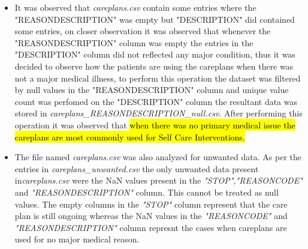 \documentclass[12pt, twosided]{report}  %
\begin{document}
\begin{itemize}
	\item It was observed that \textit{careplans.csv} contain some entries where the "REASONDESCRIPTION" was empty but "DESCRIPTION" did contained some entries, on closer observation it was observed that whenever the "REASONDESCRIPTION" column was empty the entries in the "DESCRIPTION" column did  not reflected any major condition, thus it was decided to observe how the patients are using the careplans when there was not a major medical illness, to perform this operation the dataset was filtered by null values in the "REASONDESCRIPTION" column and unique value count was perfomed on the "DESCRIPTION" column the resultant data was stored in \textit{careplans\_REASONDESCRIPTION\_null.csv}. After performing this operation it was observed that \hl{when there was no primary medical issue the careplans are most commonly used for Self Care Interventions.}
	
	\item The file named \textit{careplans.csv} was also analyzed for unwanted data. As per the entries in  \newline \textit{careplans\_unwanted.csv} the only unwanted data present in\textit{careplans.csv} were the NaN values present in the \textit{"STOP","REASONCODE"} and \textit{"REASONDESCRIPTION"} column. This cannot be treated as null values. The empty columns in the \textit{"STOP"} column represent that the care plan is still ongoing whereas the NaN values in the \textit{"REASONCODE"} and \textit{"REASONDESCRIPTION"} column represnt the cases when careplans are used for no major medical reason.
\end{itemize}
\end{document}
